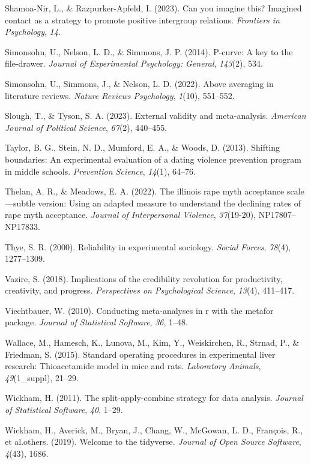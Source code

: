 \documentclass[
  ,jou]{apa6}
\newlength{\cslhangindent}
\newenvironment{CSLReferences}[2] %
 {\begin{list}{}{%
  \setlength{\itemindent}{0pt}
  \setlength{\leftmargin}{0pt}
  \setlength{\parsep}{0pt}
  \ifodd #1
   \setlength{\leftmargin}{\cslhangindent}
   \setlength{\itemindent}{-1\cslhangindent}
  \fi
  \setlength{\itemsep}{#2\baselineskip}}}
 {\end{list}}
\begin{document}
\begin{CSLReferences}{1}{0}
Shamoa-Nir, L., \& Razpurker-Apfeld, I. (2023). Can you imagine this? Imagined contact as a strategy to promote positive intergroup relations. \emph{Frontiers in Psychology}, \emph{14}.

Simonsohn, U., Nelson, L. D., \& Simmons, J. P. (2014). P-curve: A key to the file-drawer. \emph{Journal of Experimental Psychology: General}, \emph{143}(2), 534.

Simonsohn, U., Simmons, J., \& Nelson, L. D. (2022). Above averaging in literature reviews. \emph{Nature Reviews Psychology}, \emph{1}(10), 551--552.

Slough, T., \& Tyson, S. A. (2023). External validity and meta-analysis. \emph{American Journal of Political Science}, \emph{67}(2), 440--455.

Taylor, B. G., Stein, N. D., Mumford, E. A., \& Woods, D. (2013). Shifting boundaries: An experimental evaluation of a dating violence prevention program in middle schools. \emph{Prevention Science}, \emph{14}(1), 64--76.

Thelan, A. R., \& Meadows, E. A. (2022). The illinois rape myth acceptance scale---subtle version: Using an adapted measure to understand the declining rates of rape myth acceptance. \emph{Journal of Interpersonal Violence}, \emph{37}(19-20), NP17807--NP17833.

Thye, S. R. (2000). Reliability in experimental sociology. \emph{Social Forces}, \emph{78}(4), 1277--1309.

Vazire, S. (2018). Implications of the credibility revolution for productivity, creativity, and progress. \emph{Perspectives on Psychological Science}, \emph{13}(4), 411--417.

Viechtbauer, W. (2010). Conducting meta-analyses in r with the metafor package. \emph{Journal of Statistical Software}, \emph{36}, 1--48.

Wallace, M., Hamesch, K., Lunova, M., Kim, Y., Weiskirchen, R., Strnad, P., \& Friedman, S. (2015). Standard operating procedures in experimental liver research: Thioacetamide model in mice and rats. \emph{Laboratory Animals}, \emph{49}(1\_suppl), 21--29.

Wickham, H. (2011). The split-apply-combine strategy for data analysis. \emph{Journal of Statistical Software}, \emph{40}, 1--29.

Wickham, H., Averick, M., Bryan, J., Chang, W., McGowan, L. D., François, R., et al.others. (2019). Welcome to the tidyverse. \emph{Journal of Open Source Software}, \emph{4}(43), 1686.

\end{CSLReferences}
\end{document}
